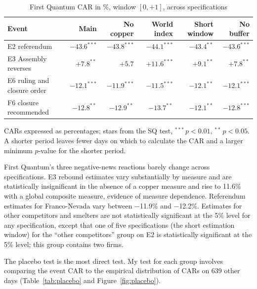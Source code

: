 \documentclass[11pt]{article}
\begin{document}
\begin{table}[h]
\centering
\caption{First Quantum CAR in \%, window $[0,+1]$, across specifications}
\label{tab:robust}
\small
\begin{tabular}{l r r r r r}
\toprule
Event & Main & No copper & World index & Short window & No buffer \\
\midrule
E2 referendum & $-43.6^{***}$ & $-43.8^{***}$ & $-44.1^{***}$ & $-43.4^{**}$ & $-43.6^{***}$ \\
E3 Assembly reverses & $+7.8^{**}$ & $+5.7$ & $+11.6^{***}$ & $+9.1^{**}$ & $+7.8^{**}$ \\
E6 ruling and closure order & $-12.1^{***}$ & $-11.9^{***}$ & $-11.5^{***}$ & $-12.1^{**}$ & $-12.1^{***}$ \\
F6 closure recommended & $-12.8^{**}$ & $-12.9^{**}$ & $-13.7^{**}$ & $-12.1^{**}$ & $-12.8^{***}$ \\
\bottomrule
\end{tabular}

\vspace{0.3em}
\parbox{0.92\textwidth}{\footnotesize CARs expressed as percentages; stars from the SQ test, $^{***}\,p<0.01$, $^{**}\,p<0.05$. A shorter period leaves fewer days on which to calculate the CAR and a larger minimum $p$-value for the shorter period.}
\end{table}

First Quantum's three negative-news reactions barely change across specifications. E3 rebound estimates vary substantially by measure and are statistically insignificant in the absence of a copper measure and rise to 11.6\% with a global composite measure, evidence of measure dependence. Referendum estimates for Franco-Nevada vary between $-$11.9\% and $-$12.2\%. Estimates for other competitors and smelters are not statistically significant at the 5\% level for any specification, except that one of five specifications (the short estimation window) for the ``other competitors'' group on E2 is statistically significant at the 5\% level; this group contains two firms.

The placebo test is the most direct test. My test for each group involves comparing the event CAR to the empirical distribution of CARs on 639 other days (Table~\ref{tab:placebo} and Figure~\ref{fig:placebo}).
\end{document}
